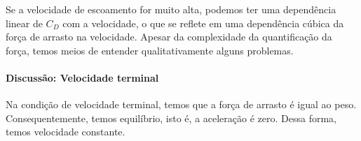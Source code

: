 Se a velocidade de escoamento for muito alta, podemos ter uma dependência linear de $C_D$ com a velocidade, o que se reflete em uma dependência cúbica da força de arrasto na velocidade. Apesar da complexidade da quantificação da força, temos meios de entender qualitativamente alguns problemas.

\paragraph{Discussão: Velocidade terminal}
\begin{marginfigure}[-2cm]
\centering
{}
\caption{Na condição de velocidade terminal, temos que a força de arrasto é igual ao peso. Consequentemente, temos equilíbrio, isto é, a aceleração é zero. Dessa forma, temos velocidade constante.}
\end{marginfigure}

